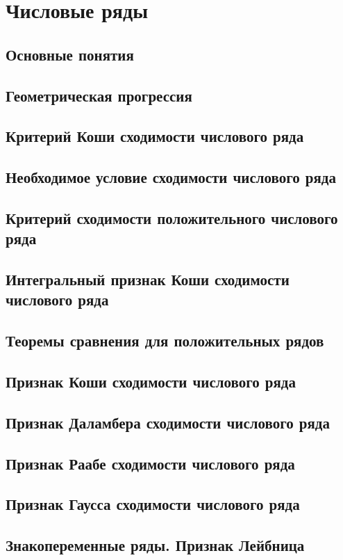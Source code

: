 \section{Числовые ряды}
\subsection{Основные понятия}
\subsection{Геометрическая прогрессия}
\subsection{Критерий Коши сходимости числового ряда}
\subsection{Необходимое условие сходимости числового ряда}
\subsection{Критерий сходимости положительного числового ряда}
\subsection{Интегральный признак Коши сходимости числового ряда}
\subsection{Теоремы сравнения для положительных рядов}
\subsection{Признак Коши сходимости числового ряда}
\subsection{Признак Даламбера сходимости числового ряда}
\subsection{Признак Раабе сходимости числового ряда}
\subsection{Признак Гаусса сходимости числового ряда}
\subsection{Знакопеременные ряды. Признак Лейбница}
